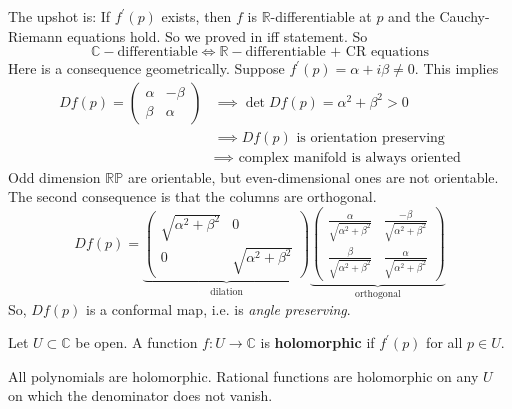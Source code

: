 	The upshot is: If $f^\prime (p)$ exists, then $f$ is $\mathbb{R}$-differentiable at $p$ and the Cauchy-Riemann equations hold. So we proved in iff statement. So 
	\begin{equation}
		\mathbb{C}-\text{differentiable} \iff \mathbb{R}-\text{differentiable + CR equations}
	\end{equation}
	Here is a consequence geometrically. Suppose $f^\prime (p) = \alpha + i \beta \neq 0$. This implies 
	\begin{align}
		Df(p) = \begin{pmatrix} \alpha & -\beta \\ \beta & \alpha \end{pmatrix} & \implies \det{Df(p)} = \alpha^2 + \beta^2 > 0 \\ 
																	 & \implies Df(p) \text{ is orientation preserving} \\ 
																	 & \implies \text{ complex manifold is always oriented} 
	\end{align}
	Odd dimension $\mathbb{RP}$ are orientable, but even-dimensional ones are not orientable. The second consequence is that the columns are orthogonal. 
	\begin{equation}
		Df(p) = \underbrace{\begin{pmatrix} \sqrt{\alpha^2 + \beta^2} & 0 \\ 0 & \sqrt{\alpha^2 + \beta^2} \end{pmatrix}}_{\text{dilation}} \underbrace{\begin{pmatrix}
			\frac{\alpha}{\sqrt{\alpha^2 + \beta^2}} & \frac{-\beta}{\sqrt{\alpha^2 + \beta^2}} \\ 
			\frac{\beta}{\sqrt{\alpha^2 + \beta^2}} & \frac{\alpha}{\sqrt{\alpha^2 + \beta^2}} 
		\end{pmatrix}}_{\text{orthogonal}}
	\end{equation}
	So, $Df(p)$ is a conformal map, i.e. is \textit{angle preserving}. 

	\begin{definition}
	  \label{def:holomorphic-function-2}
		Let $U \subset \mathbb{C}$ be open. A function $f: U \to \mathbb{C}$ is \textbf{holomorphic} if $f^\prime (p)$ for all $p \in U$. 
	\end{definition}

	\begin{example}
	  \label{ex:holomorphy-of-polynomials-and-rational-functions}
		All polynomials are holomorphic. Rational functions are holomorphic on any $U$ on which the denominator does not vanish. 
	\end{example}

